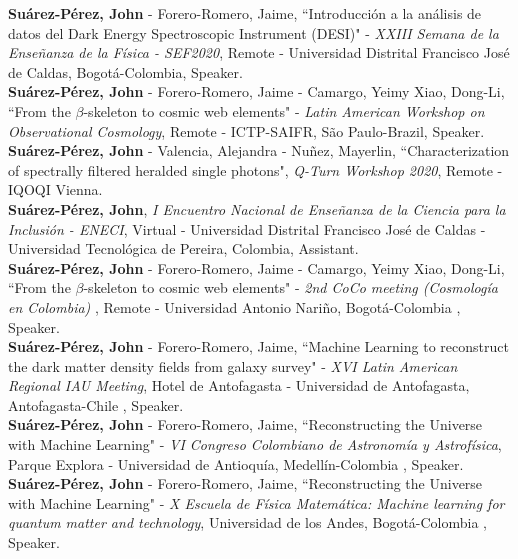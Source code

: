 \documentclass[10pt, a4paper]{article}
\newcommand{\years}[1]{\marginnote{\scriptsize #1}}
\begin{document}
\years{2020}\textbf{Suárez-Pérez, John} - Forero-Romero, Jaime, “Introducción a la análisis de datos del Dark Energy Spectroscopic Instrument (DESI)" - \emph{XXIII Semana de la Enseñanza de la Física - SEF2020}, Remote - Universidad Distrital Francisco José de Caldas, Bogotá-Colombia, Speaker.\\

\years{2020}\textbf{Suárez-Pérez, John} - Forero-Romero, Jaime - Camargo, Yeimy  Xiao, Dong-Li, “From the $\beta$-skeleton to cosmic web elements" - \emph{Latin American Workshop on Observational Cosmology}, Remote - ICTP-SAIFR, São Paulo-Brazil, Speaker.\\

\years{2020}\textbf{Suárez-Pérez, John} - Valencia, Alejandra - Nuñez, Mayerlin, “Characterization of spectrally filtered heralded single photons", \emph{Q-Turn Workshop 2020}, Remote - IQOQI Vienna.\\

\years{2020}\textbf{Suárez-Pérez, John}, \emph{I Encuentro Nacional de Enseñanza de la Ciencia para la Inclusión - ENECI}, Virtual - Universidad Distrital Francisco José de Caldas - Universidad Tecnológica de Pereira, Colombia, Assistant.\\

\years{2020}\textbf{Suárez-Pérez, John} - Forero-Romero, Jaime - Camargo, Yeimy  Xiao, Dong-Li, “From the $\beta$-skeleton to cosmic web elements" - \emph{2nd CoCo meeting (Cosmología en Colombia) }, Remote - Universidad Antonio Nariño, Bogotá-Colombia , Speaker.\\

\years{2019}\textbf{Suárez-Pérez, John} - Forero-Romero, Jaime, “Machine Learning to reconstruct the dark matter density fields from galaxy survey" - \emph{XVI Latin American Regional IAU Meeting}, Hotel de Antofagasta - Universidad de Antofagasta, Antofagasta-Chile , Speaker.\\

\years{2019}\textbf{Suárez-Pérez, John} - Forero-Romero, Jaime, “Reconstructing the Universe with Machine Learning" - \emph{VI Congreso Colombiano de Astronomía y Astrofísica}, Parque Explora - Universidad de Antioquía, Medellín-Colombia , Speaker.\\

\years{2019}\textbf{Suárez-Pérez, John} - Forero-Romero, Jaime, “Reconstructing the Universe with Machine Learning" - \emph{X Escuela de Física Matemática: Machine learning for quantum matter and technology}, Universidad de los Andes, Bogotá-Colombia , Speaker.\\
\end{document}
